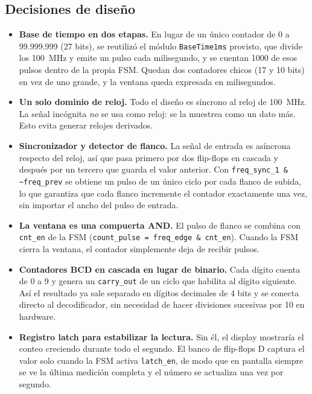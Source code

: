 \documentclass[11pt,a4paper]{article}
\begin{document}
\subsection*{Decisiones de diseño}

\begin{itemize}
  \item \textbf{Base de tiempo en dos etapas.} En lugar de un único contador de 0 a 99.999.999
  (27 bits), se reutilizó el módulo \texttt{BaseTime1ms} provisto, que divide los 100~MHz y emite un
  pulso cada milisegundo, y se cuentan 1000 de esos pulsos dentro de la propia FSM. Quedan dos
  contadores chicos (17 y 10 bits) en vez de uno grande, y la ventana queda expresada en
  milisegundos.

  \item \textbf{Un solo dominio de reloj.} Todo el diseño es síncrono al reloj de 100~MHz. La señal
  incógnita \emph{no} se usa como reloj: se la muestrea como un dato más. Esto evita generar relojes
  derivados.

  \item \textbf{Sincronizador y detector de flanco.} La señal de entrada es asíncrona respecto del
  reloj, así que pasa primero por dos flip-flops en cascada y después por un tercero que guarda el valor anterior. Con
  \texttt{freq\_sync\_1 \& \textasciitilde freq\_prev} se obtiene un pulso de un único ciclo por
  cada flanco de subida, lo que garantiza que cada flanco incremente el contador exactamente una
  vez, sin importar el ancho del pulso de entrada.

  \item \textbf{La ventana es una compuerta AND.} El pulso de flanco se combina con \texttt{cnt\_en}
  de la FSM (\texttt{count\_pulse = freq\_edge \& cnt\_en}). Cuando la FSM cierra la ventana, el
  contador simplemente deja de recibir pulsos.

  \item \textbf{Contadores BCD en cascada en lugar de binario.} Cada dígito cuenta de 0 a 9 y genera
  un \texttt{carry\_out} de un ciclo que habilita al dígito siguiente. Así el resultado ya sale
  separado en dígitos decimales de 4 bits y se conecta directo al decodificador, sin necesidad de
  hacer divisiones sucesivas por 10 en hardware.

  \item \textbf{Registro latch para estabilizar la lectura.} Sin él, el display mostraría el conteo
  creciendo durante todo el segundo. El banco de flip-flops D captura el valor solo cuando la FSM
  activa \texttt{latch\_en}, de modo que en pantalla siempre se ve la última medición completa y el
  número se actualiza una vez por segundo.
\end{itemize}
\end{document}
